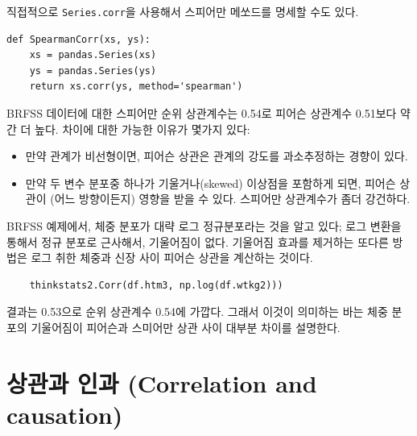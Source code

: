 직접적으로 {\tt Series.corr}을 사용해서 스피어만 메쏘드를 명세할 수도 있다.

\begin{verbatim}
def SpearmanCorr(xs, ys):
    xs = pandas.Series(xs)
    ys = pandas.Series(ys)
    return xs.corr(ys, method='spearman')
\end{verbatim}

BRFSS 데이터에 대한 스피어만 순위 상관계수는 0.54로 피어슨 상관계수 0.51보다 약간 더 높다. 차이에 대한 가능한 이유가 몇가지 있다:


\begin{itemize}

\item 만약 관계가 비선형이면, 피어슨 상관은 관계의 강도를 과소추정하는 경향이 있다.

\item 만약 두 변수 분포중 하나가 기울거나(skewed) 이상점을 포함하게 되면, 피어슨 상관이 (어느 방향이든지) 영향을 받을 수 있다. 스피어만 상관계수가 좀더 강건하다.  


\end{itemize}

BRFSS 예제에서, 체중 분포가 대략 로그 정규분포라는 것을 알고 있다; 로그 변환을 통해서 정규 분포로 근사해서, 기울어짐이 없다.
기울어짐 효과를 제거하는 또다른 방법은 로그 취한 체중과 신장 사이 피어슨 상관을 계산하는 것이다.


\begin{verbatim}
    thinkstats2.Corr(df.htm3, np.log(df.wtkg2)))
\end{verbatim}

결과는 0.53으로 순위 상관계수 0.54에 가깝다. 그래서 이것이 의미하는 바는 체중 분포의 기울어짐이 피어슨과 스미어만 상관 사이 대부분 차이를 설명한다.


\section{상관과 인과 (Correlation and causation)}

